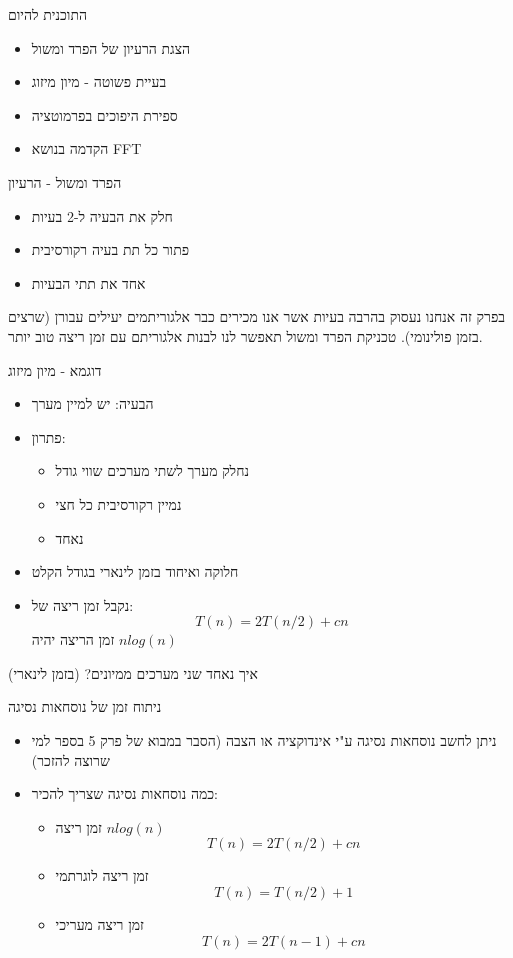 \documentclass[handout]{beamer}
\newcommand{\E}[1]{\foreignlanguage{english}{\fontspec{Open Sans}#1}}
\begin{document}
\begin{frame}{התוכנית להיום}
\pause
\begin{itemize}[<+->]
	\item הצגת הרעיון של הפרד ומשול
	\item בעיית פשוטה - מיון מיזוג
	\item ספירת היפוכים בפרמוטציה
	\item הקדמה בנושא FFT
\end{itemize}
\end{frame}

\begin{frame}{הפרד ומשול - הרעיון}
\pause
\begin{itemize}[<+->]
	\item  חלק את הבעיה ל-2 בעיות
	\item פתור כל תת בעיה רקורסיבית
	\item אחד את תתי הבעיות
\end{itemize}
\pause
בפרק זה אנחנו נעסוק בהרבה בעיות אשר אנו מכירים כבר אלגוריתמים יעילים עבורן (שרצים בזמן פולינומי). טכניקת הפרד ומשול תאפשר לנו לבנות אלגוריתם עם זמן ריצה טוב יותר.
\end{frame}
\begin{frame}{דוגמא - מיון מיזוג}
\pause
\begin{itemize}[<+->]
	\item הבעיה: יש למיין מערך
	\item פתרון:
	\pause
	\begin{itemize}[<+->]
		\item נחלק מערך לשתי מערכים שווי גודל
		\item נמיין רקורסיבית כל חצי
		\item נאחד
	\end{itemize}
	\item חלוקה ואיחוד בזמן לינארי בגודל הקלט
	\item נקבל זמן ריצה של:
	$$T(n)=2T(n/2) +cn$$
	זמן הריצה יהיה \E{$nlog(n)$}
\end{itemize}
\end{frame}
\begin{frame}{איך נאחד שני מערכים ממיונים? (בזמן לינארי)}

\end{frame}
\begin{frame}{ניתוח זמן של נוסחאות נסיגה}
\pause
\begin{itemize}[<+->]
	\item ניתן לחשב נוסחאות נסיגה ע"י אינדוקציה או הצבה (הסבר במבוא של פרק 5 בספר למי שרוצה להזכר)
	\item כמה נוסחאות נסיגה שצריך להכיר:
	\pause
	\begin{itemize}[<+->]
		\item זמן ריצה \E{$nlog(n)$}
		$$T(n)=2T(n/2) +cn$$
		\item זמן ריצה לוגרתמי
		$$T(n)=T(n/2) +1$$
		\item זמן ריצה מעריכי
		$$T(n)=2T(n-1) +cn$$
	\end{itemize}
\end{itemize}
\end{frame}
\end{document}
